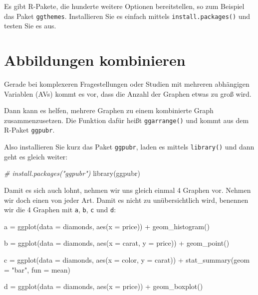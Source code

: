 \documentclass[
]{book}
\newenvironment{Shaded}{\begin{snugshade}}{\end{snugshade}}
\newcommand{\AttributeTok}[1]{\textcolor[rgb]{0.77,0.63,0.00}{#1}}
\newcommand{\CommentTok}[1]{\textcolor[rgb]{0.56,0.35,0.01}{\textit{#1}}}
\newcommand{\FunctionTok}[1]{\textcolor[rgb]{0.00,0.00,0.00}{#1}}
\newcommand{\NormalTok}[1]{#1}
\newcommand{\OtherTok}[1]{\textcolor[rgb]{0.56,0.35,0.01}{#1}}
\newcommand{\SpecialCharTok}[1]{\textcolor[rgb]{0.00,0.00,0.00}{#1}}
\newcommand{\StringTok}[1]{\textcolor[rgb]{0.31,0.60,0.02}{#1}}
\begin{document}
Es gibt R-Pakete, die hunderte weitere Optionen bereitstellen, so zum Beispiel das Paket \texttt{ggthemes}. Installieren Sie es einfach mittels \texttt{install.packages()} und testen Sie es aus.

\hypertarget{abbildungen-kombinieren}{%
\section{Abbildungen kombinieren}\label{abbildungen-kombinieren}}

Gerade bei komplexeren Fragestellungen oder Studien mit mehreren abhängigen Variablen (AVs) kommt es vor, dass die Anzahl der Graphen etwas zu groß wird.

Dann kann es helfen, mehrere Graphen zu einem kombinierte Graph zusammenzusetzen. Die Funktion dafür heißt \texttt{ggarrange()} und kommt aus dem R-Paket \texttt{ggpubr}.

Also installieren Sie kurz das Paket \texttt{ggpubr}, laden es mittels \texttt{library()} und dann geht es gleich weiter:

\begin{Shaded}
\begin{Highlighting}[]
\CommentTok{\# install.packages("ggpubr")}
\FunctionTok{library}\NormalTok{(ggpubr)}
\end{Highlighting}
\end{Shaded}

Damit es sich auch lohnt, nehmen wir uns gleich einmal 4 Graphen vor. Nehmen wir doch einen von jeder Art. Damit es nicht zu unübersichtlich wird, benennen wir die 4 Graphen mit \texttt{a}, \texttt{b}, \texttt{c} und \texttt{d}:

\begin{Shaded}
\begin{Highlighting}[]
\NormalTok{a }\OtherTok{=} \FunctionTok{ggplot}\NormalTok{(}\AttributeTok{data =}\NormalTok{ diamonds, }\FunctionTok{aes}\NormalTok{(}\AttributeTok{x =}\NormalTok{ price)) }\SpecialCharTok{+}
  \FunctionTok{geom\_histogram}\NormalTok{()}

\NormalTok{b }\OtherTok{=} \FunctionTok{ggplot}\NormalTok{(}\AttributeTok{data =}\NormalTok{ diamonds, }\FunctionTok{aes}\NormalTok{(}\AttributeTok{x =}\NormalTok{ carat, }\AttributeTok{y =}\NormalTok{ price)) }\SpecialCharTok{+}
  \FunctionTok{geom\_point}\NormalTok{()}

\NormalTok{c }\OtherTok{=} \FunctionTok{ggplot}\NormalTok{(}\AttributeTok{data =}\NormalTok{ diamonds, }\FunctionTok{aes}\NormalTok{(}\AttributeTok{x =}\NormalTok{ color, }\AttributeTok{y =}\NormalTok{ carat)) }\SpecialCharTok{+}
  \FunctionTok{stat\_summary}\NormalTok{(}\AttributeTok{geom =} \StringTok{"bar"}\NormalTok{, }\AttributeTok{fun =}\NormalTok{ mean) }

\NormalTok{d }\OtherTok{=} \FunctionTok{ggplot}\NormalTok{(}\AttributeTok{data =}\NormalTok{ diamonds, }\FunctionTok{aes}\NormalTok{(}\AttributeTok{x =}\NormalTok{ price)) }\SpecialCharTok{+}
  \FunctionTok{geom\_boxplot}\NormalTok{()}
\end{Highlighting}
\end{Shaded}
\end{document}
